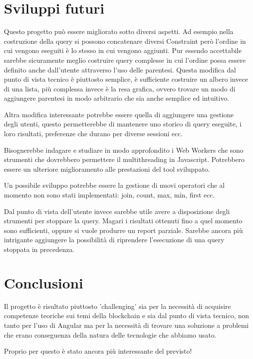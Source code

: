 \section{Sviluppi futuri}
Questo progetto può essere migliorato sotto diversi aspetti.
Ad esempio nella costruzione della query si possono concatenare diversi Constraint però l'ordine in cui vengono eseguiti è lo stesso in cui vengono aggiunti.
Pur essendo accettabile sarebbe sicuramente meglio costruire query complesse in cui l'ordine possa essere definito anche dall'utente attraverso l'uso delle parentesi.
Questa modifica dal punto di vista tecnico è piuttosto semplice, è sufficiente costruire un albero invece di una lista, più complessa invece è la resa grafica, ovvero trovare un modo di aggiungere parentesi in modo arbitrario che sia anche semplice ed intuitivo.

\vspace{0.5cm}

Altra modifica interessante potrebbe essere quella di aggiungere una gestione degli utenti, questo permetterebbe di mantenere uno storico di query eseguite, i loro risultati, preferenze che durano per diverse sessioni ecc.

\vspace{0.5cm}
Bisognerebbe indagare e studiare in modo approfondito i Web Workers che sono strumenti che dovrebbero permettere il multithreading in Javascript.
Potrebbero essere un ulteriore miglioramento alle prestazioni del tool sviluppato.

\vspace{0.5cm}
Un possibile sviluppo potrebbe essere la gestione di nuovi operatori che al momento non sono stati implementati:
join, count, max, min, first ecc.

\vspace{0.5cm}
Dal punto di vista dell'utente invece sarebbe utile avere a disposizione degli strumenti per stoppare la query.
Magari i risultati ottenuti fino a quel momento sono sufficienti, oppure si vuole produrre un report parziale.
Sarebbe ancora più intrigante aggiungere la possibilità di riprendere l'esecuzione di una query stoppata in precedenza.

\section{Conclusioni}
Il progetto è risultato piuttosto 'challenging' sia per la necessità di acquisire competenze teoriche sui temi della blockchain e sia dal punto di vista tecnico,
non tanto per l'uso di Angular ma per la necessità di trovare una soluzione a problemi che erano conseguenza della natura delle tecnologie che abbiamo usato.

\vspace{0.5cm}

Proprio per questo è stato ancora più interessante del previsto!
